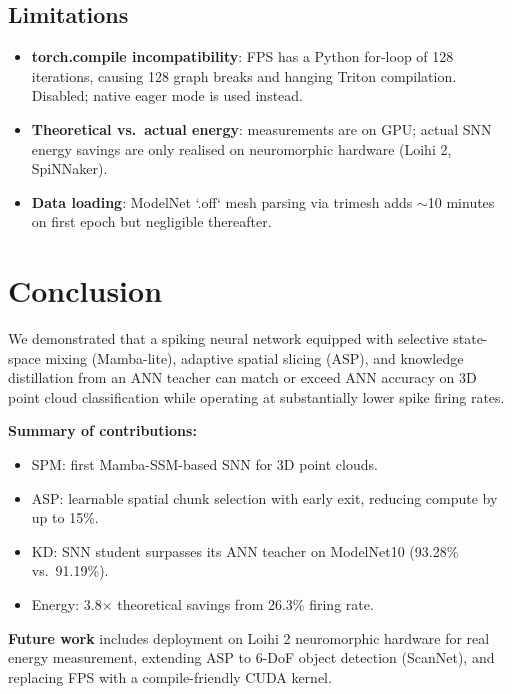 \documentclass[11pt,a4paper]{article}
\begin{document}
\subsection{Limitations}
\begin{itemize}
  \item \textbf{torch.compile incompatibility}: FPS has a Python for-loop of 128 iterations, causing 128 graph breaks and hanging Triton compilation. Disabled; native eager mode is used instead.
  \item \textbf{Theoretical vs.\ actual energy}: measurements are on GPU; actual SNN energy savings are only realised on neuromorphic hardware (Loihi 2, SpiNNaker).
  \item \textbf{Data loading}: ModelNet `.off` mesh parsing via trimesh adds $\sim$10 minutes on first epoch but negligible thereafter.
\end{itemize}

\section{Conclusion}

We demonstrated that a spiking neural network equipped with selective state-space mixing (Mamba-lite), adaptive spatial slicing (ASP), and knowledge distillation from an ANN teacher can match or exceed ANN accuracy on 3D point cloud classification while operating at substantially lower spike firing rates.

\begin{keybox}
\textbf{Summary of contributions:}
\begin{itemize}
  \item SPM: first Mamba-SSM-based SNN for 3D point clouds.
  \item ASP: learnable spatial chunk selection with early exit, reducing compute by up to 15\%.
  \item KD: SNN student surpasses its ANN teacher on ModelNet10 (93.28\% vs.\ 91.19\%).
  \item Energy: 3.8$\times$ theoretical savings from 26.3\% firing rate.
\end{itemize}
\end{keybox}

\textbf{Future work} includes deployment on Loihi 2 neuromorphic hardware for real energy measurement, extending ASP to 6-DoF object detection (ScanNet), and replacing FPS with a compile-friendly CUDA kernel.
\end{document}
